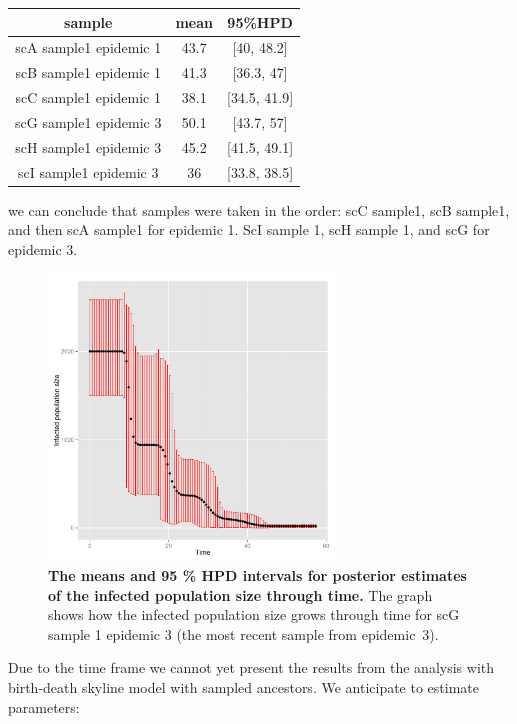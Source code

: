 \documentclass[12pt]{article}
\begin{document}
\vskip2mm

\begin{tabular} {ccc}
sample & mean & 95\%HPD \\
\hline
scA sample1 epidemic 1 & 43.7 & [40, 48.2] \\
scB sample1 epidemic 1 & 41.3 & [36.3, 47] \\
scC sample1 epidemic 1 & 38.1 & [34.5, 41.9] \\
scG sample1 epidemic 3 & 50.1 & [43.7, 57] \\
scH sample1 epidemic 3 & 45.2 & [41.5, 49.1] \\
scI sample1 epidemic 3 & 36 & [33.8, 38.5]  \\
\end{tabular}

\vskip2mm

\noindent we can conclude that samples were taken in the order: scC sample1, scB sample1, and then scA sample1 for epidemic 1. ScI sample 1, scH sample 1, and  scG for epidemic 3. 

\begin{center} 
\begin{figure}[!h]
\includegraphics[width=3in]{popSize}
\caption{\footnotesize {\bf The means and 95 \% HPD intervals for posterior estimates of the infected population size through time.} 
The graph shows how the infected population size  grows through time for scG sample 1 epidemic 3 (the most recent sample from epidemic~3).} 
\label{fig: popSize} 
\end{figure}
\end{center} 

Due to the time frame we cannot yet present the results from the analysis with birth-death skyline model with sampled ancestors. We anticipate to estimate parameters: 
\vskip2mm
\end{document}

